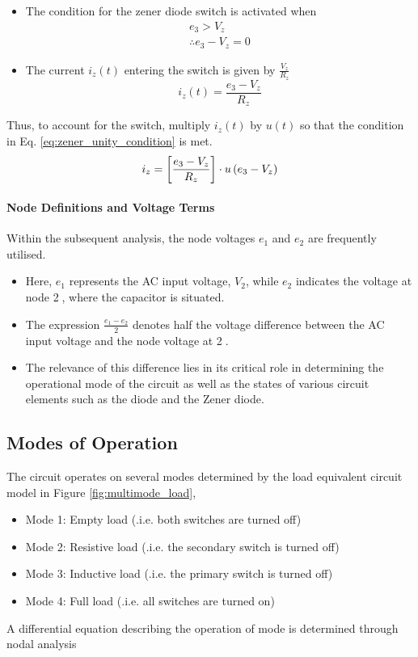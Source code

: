 \begin{itemize}
	\item The condition for the zener diode switch is activated when \begin{equation}
		\begin{split}
			e_3 > V_z \\
			\therefore e_3 - V_z = 0
			\label{eq:zener_unity_condition}
		\end{split}
	\end{equation}
	\item The current $i_z(t)$ entering the switch is given by $\frac{V_z}{R_z}$
	\begin{equation}
		i_z(t) = \frac{e_3 - V_z}{R_z}
	\end{equation}
\end{itemize}
Thus, to account for the switch, multiply $i_z(t)$ by $u(t)$ so that the condition in Eq. \ref{eq:zener_unity_condition} is met.
\begin{equation}
    i_z = \left[\frac{e_3 - V_z}{R_z} \right]\cdot u\left(e_3 - V_z \right)
    \label{eq:zener_current}
\end{equation}

\paragraph{Node Definitions and Voltage Terms}
Within the subsequent analysis, the node voltages $e_1$ and $e_2$ are frequently utilised.
\begin{itemize}
	\item Here, $e_1$ represents the AC input voltage, $V_2$, while $e_2$ indicates the voltage at node \textcircled{2}, where the capacitor is situated.
	\item The expression $\frac{e_1 - e_2}{2}$ denotes half the voltage difference between the AC input voltage and the node voltage at \textcircled{2}.
	\item The relevance of this difference lies in its critical role in determining the operational mode of the circuit as well as the states of various circuit elements such as the diode and the Zener diode.
\end{itemize}

\pagebreak
\subsection{Modes of Operation}
The circuit operates on several modes determined by the load equivalent circuit model in Figure \ref{fig:multimode_load},
\begin{itemize}
	\item Mode 1: Empty load (.i.e. both switches are turned off)
	\item Mode 2: Resistive load (.i.e. the secondary switch is turned off) 
	\item Mode 3: Inductive load (.i.e. the primary switch is turned off)
	\item Mode 4: Full load (.i.e. all switches are turned on)
\end{itemize}
A differential equation describing the operation of mode is determined through nodal analysis

